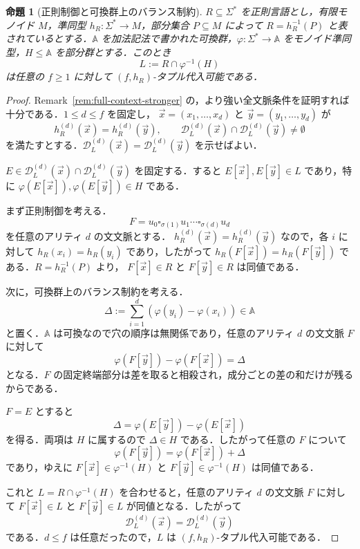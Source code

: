 \documentclass[11pt,a4paper]{ltjsarticle}
\numberwithin{equation}{section}
\theoremstyle{plain}
\newtheorem{proposition}[theorem]{命題}
\theoremstyle{definition}
\theoremstyle{remark}
\newcommand{\D}{\mathcal{D}}
\newcommand{\tuple}[1]{\vec{#1}}
\newcommand{\blank}{\square}
\begin{document}
\begin{proposition}[正則制御と可換群上のバランス制約]
\label{prop:regular-abelian-balance}
$R\subseteq\Sigma^*$ を正則言語とし，有限モノイド $M$，準同型 $h_R\colon\Sigma^*\to M$，部分集合 $P\subseteq M$ によって
$R=h_R^{-1}(P)$ と表されているとする．$\mathbb A$ を加法記法で書かれた可換群，$\varphi\colon\Sigma^*\to\mathbb A$ をモノイド準同型，$H\le\mathbb A$ を部分群とする．このとき
\[
L:=R\cap\varphi^{-1}(H)
\]
は任意の $f\ge1$ に対して $(f,h_R)$-タプル代入可能である．
\end{proposition}

\begin{proof}
Remark~\ref{rem:full-context-stronger} の，より強い全文脈条件を証明すれば十分である．$1\le d\le f$ を固定し，
$\tuple{x}=(x_1,\ldots,x_d)$ と $\tuple{y}=(y_1,\ldots,y_d)$ が
\[
h_R^{(d)}(\tuple{x})=h_R^{(d)}(\tuple{y}),
\qquad
\D_L^{(d)}(\tuple{x})\cap\D_L^{(d)}(\tuple{y})\ne\emptyset
\]
を満たすとする．$\D_L^{(d)}(\tuple{x})=\D_L^{(d)}(\tuple{y})$ を示せばよい．

$E\in\D_L^{(d)}(\tuple{x})\cap\D_L^{(d)}(\tuple{y})$ を固定する．すると
$E[\tuple{x}],E[\tuple{y}]\in L$ であり，特に
$\varphi(E[\tuple{x}]),\varphi(E[\tuple{y}])\in H$ である．

まず正則制御を考える．
\[
F=u_0\blank_{\sigma(1)}u_1\cdots\blank_{\sigma(d)}u_d
\]
を任意のアリティ $d$ の文文脈とする．
$h_R^{(d)}(\tuple{x})=h_R^{(d)}(\tuple{y})$ なので，各 $i$ に対して
$h_R(x_i)=h_R(y_i)$ であり，したがって
$h_R(F[\tuple{x}])=h_R(F[\tuple{y}])$ である．$R=h_R^{-1}(P)$ より，
$F[\tuple{x}]\in R$ と $F[\tuple{y}]\in R$ は同値である．

次に，可換群上のバランス制約を考える．
\[
\Delta:=\sum_{i=1}^d(\varphi(y_i)-\varphi(x_i))\in\mathbb A
\]
と置く．$\mathbb A$ は可換なので穴の順序は無関係であり，任意のアリティ $d$ の文文脈 $F$ に対して
\[
\varphi(F[\tuple{y}])-\varphi(F[\tuple{x}])=\Delta
\]
となる．$F$ の固定終端部分は差を取ると相殺され，成分ごとの差の和だけが残るからである．

$F=E$ とすると
\[
\Delta=\varphi(E[\tuple{y}])-\varphi(E[\tuple{x}])
\]
を得る．両項は $H$ に属するので $\Delta\in H$ である．したがって任意の $F$ について
\[
\varphi(F[\tuple{y}])=\varphi(F[\tuple{x}])+\Delta
\]
であり，ゆえに
$F[\tuple{x}]\in\varphi^{-1}(H)$ と
$F[\tuple{y}]\in\varphi^{-1}(H)$ は同値である．

これと $L=R\cap\varphi^{-1}(H)$ を合わせると，任意のアリティ $d$ の文文脈 $F$ に対して
$F[\tuple{x}]\in L$ と $F[\tuple{y}]\in L$ が同値となる．したがって
\[
\D_L^{(d)}(\tuple{x})=\D_L^{(d)}(\tuple{y})
\]
である．$d\le f$ は任意だったので，$L$ は $(f,h_R)$-タプル代入可能である．
\end{proof}
\end{document}
